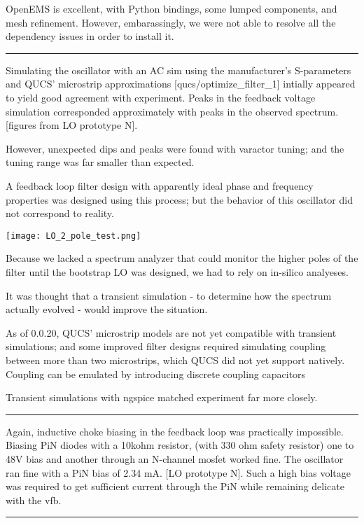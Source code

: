 \documentclass[fleqn,10pt]{article}
\begin{document}
\begin{multicols}{1}
OpenEMS is excellent, with Python bindings, some lumped components, and mesh refinement. However, embarassingly, we were not able to resolve all the dependency issues in order to install it.

\rule{\linewidth}{0.2pt}

Simulating the oscillator with an AC sim using the manufacturer's S-parameters and QUCS' microstrip approximations [qucs/optimize\_filter\_1] intially appeared to yield good agreement with experiment. Peaks in the feedback voltage simulation corresponded approximately with peaks in the observed spectrum. [figures from LO prototype N]. 
 
However, unexpected dips and peaks were found with varactor tuning; and the tuning range was far smaller than expected.

A feedback loop filter design with apparently ideal phase and frequency properties was designed using this process; but the behavior of this oscillator did not correspond to reality. 

\hspace*{-0.7cm}   \texttt{[image: LO\_2\_pole\_test.png]}

Because we lacked a spectrum analyzer that could monitor the higher poles of the filter until the bootstrap LO was designed, we had to rely on in-silico analyeses.

It was thought that a transient simulation - to determine how the spectrum actually evolved - would improve the situation. 

As of 0.0.20, QUCS' microstrip models are not yet compatible with transient simulations; and some improved filter designs required simulating coupling between more than two microstrips, which QUCS did not yet support natively. Coupling can be emulated by introducing discrete coupling capacitors

Transient simulations with ngspice matched experiment far more closely.

\rule{\linewidth}{0.2pt}

Again, inductive choke biasing in the feedback loop was practically impossible. Biasing PiN diodes with a 10kohm resistor, (with 330 ohm safety resistor) one to 48V bias and another through an N-channel mosfet worked fine. The oscillator ran fine with a PiN bias of 2.34 mA. [LO prototype N]. Such a high bias voltage was required to get sufficient current through the PiN while remaining delicate with the vfb.

\rule{\linewidth}{0.2pt}


\end{multicols}
\end{document}
